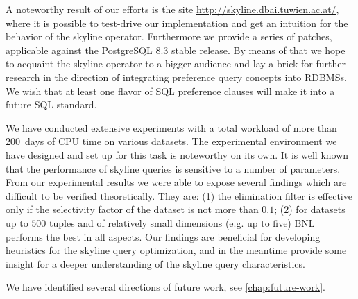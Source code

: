 A noteworthy result of our efforts is the site
\url{http://skyline.dbai.tuwien.ac.at/}, where it is possible to
test-drive our implementation and get an intuition for the behavior of
the skyline operator.  Furthermore we provide a series of patches,
applicable against the PostgreSQL 8.3 stable release. By means of that
we hope to acquaint the skyline operator to a bigger audience and
lay a brick for further research in the direction of integrating
preference query concepts into RDBMSs.  We wish that at least one
flavor of SQL preference clauses will make it into a future SQL
standard.

We have conducted extensive experiments with a total workload of 
more than 200~days of CPU time on various datasets.
The experimental environment we have designed and set up for this
task is noteworthy on its own.
%
It is well known that the performance of skyline queries is sensitive
to a number of parameters.
%
From our experimental results we were able to expose several findings
which are difficult to be verified theoretically.  They are: (1) the
elimination filter is effective only if the selectivity factor of the
dataset is not more than $0.1$; (2) for datasets up to $500$ tuples
and of relatively small dimensions (e.g. up to five) BNL performs the
best in all aspects.
%
Our findings are beneficial for developing heuristics for the skyline
query optimization, and in the meantime provide some insight for a
deeper understanding of the skyline query characteristics.

We have identified several directions of future work, see
\autoref{chap:future-work}.


% 
% 
% 
% 
% 
% 
% 
% 
% 
% 
% 

